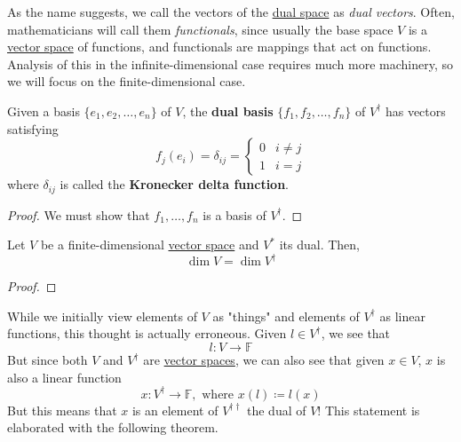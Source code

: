   As the name suggests, we call the vectors of the \hyperref[def:dual-space]{dual space} as \textit{dual vectors}. Often, mathematicians will call them \textit{functionals}, since usually the base space $V$ is a \hyperref[def:vector-space]{vector space} of functions, and functionals are mappings that act on functions. Analysis of this in the infinite-dimensional case requires much more machinery, so we will focus on the finite-dimensional case. 

  \begin{definition}
    \label{def:dual-basis}
    Given a basis $\{ e_1, e_2, \ldots, e_n\}$ of $V$, the \textbf{dual basis} $\{f_1, f_2, \ldots, f_n\}$ of $V^\dagger$ has vectors satisfying 
    \begin{equation}
      f_j (e_i) = \delta_{i j} = 
      \begin{cases}
      0 & i \neq j \\
      1 & i = j
      \end{cases}
    \end{equation}
    where $\delta_{i j}$ is called the \textbf{Kronecker delta function}. 
  \end{definition}
	\begin{proof}
	  We must show that $f_1, \ldots, f_n$ is a basis of $V^\dagger$. 
	\end{proof}

  \begin{corollary}
    \label{thm:dimensions-of-dual-of-finite-dimensional-vector}
    Let $V$ be a finite-dimensional \hyperref[def:vector-space]{vector space} and $V^\ast$ its dual. Then, 
    \begin{equation}
      \dim{V} = \dim{V^\dagger}
    \end{equation}
  \end{corollary}
  \begin{proof}
    
  \end{proof}

  While we initially view elements of $V$ as "things" and elements of $V^\dagger$ as linear functions, this thought is actually erroneous. Given $l \in V^\dagger$, we see that 
  \begin{equation}
    l: V \to \mathbb{F}
  \end{equation}
  But since both $V$ and $V^\dagger$ are \hyperref[def:vector-space]{vector spaces}, we can also see that given $x \in V$, $x$ is also a linear function 
  \begin{equation}
    x: V^\dagger \to \mathbb{F}, \text{ where } x(l) \coloneqq l(x)
  \end{equation}
  But this means that $x$ is an element of $V^{\dagger\dagger}$ the dual of $V$! This statement is elaborated with the following theorem. 

